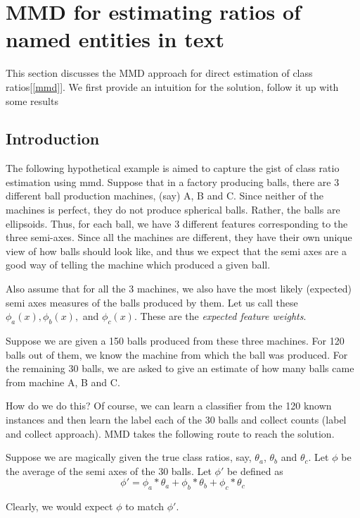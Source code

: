 \section{MMD for estimating ratios of named entities in text}
\label{sec:mmd}
This section discusses the MMD approach for direct estimation of class ratios[\ref{mmd}]. We first provide an intuition for the 
solution, follow it up with some results 
\subsection{Introduction}
The following hypothetical example is aimed to capture the gist of class ratio estimation using mmd.
Suppose that in a factory producing balls, there are 3 different ball production machines, (say) A, B and C.
Since neither of the machines is perfect, they do not produce spherical balls. Rather, the balls are
ellipsoids. Thus, for each ball, we have 3 different features corresponding to the three semi-axes. 
Since all the machines are different, they have their own unique view of how balls should look like, 
and thus we expect that the semi axes are a good way of telling the machine which produced a given ball.

Also assume that for all the 3 machines, we also have the most likely (expected) semi axes measures of the balls produced by them.
Let us call these $\phi_a(x), \phi_b(x),$ and $\phi_c(x)$. These are the \emph{expected feature weights}.

Suppose we are given a 150 balls produced from these three machines. For 120 balls out of them, we know the machine 
from which the ball was produced. For the remaining 30 balls, we are asked to give an estimate of how many balls came 
from machine A, B and C. 

How do we do this? Of course, we can learn a classifier from the 120 known instances and then learn the label each of 
the 30 balls and collect counts (label and collect approach). MMD takes the following route to reach the solution.

Suppose we are magically given the true class ratios, say, $\theta_a$, $\theta_b$ and $\theta_c$. Let  
$\phi$ be the average of the semi axes of the 30 balls. Let $\phi'$ be defined as 
\begin{equation}
 \phi' = \phi_a * \theta_a + \phi_b * \theta_b + \phi_c * \theta_c 
\end{equation}

Clearly, we would expect $\phi$ to match $\phi'$. 

